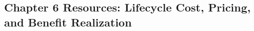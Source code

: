 \begin{refsection}
\chapter{Chapter 6 Resources: Lifecycle Cost, Pricing, and Benefit Realization}
\label{chap:comp-ch06}



\printbibliography[heading=subbibliography,title={Chapter 6 References}]
\end{refsection}
